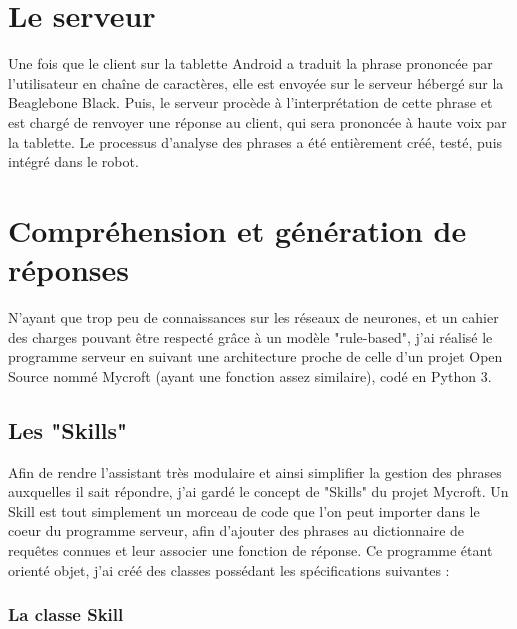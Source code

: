\documentclass{report}
\begin{document}
    \section{Le serveur}

    {Une fois que le client sur la tablette Android a traduit la phrase prononcée
    par l'utilisateur en chaîne de caractères, elle est envoyée sur le serveur
    hébergé sur la Beaglebone Black. Puis, le serveur procède à l'interprétation
    de cette phrase et est chargé de renvoyer une réponse au client, qui sera
    prononcée à haute voix par la tablette. Le processus d'analyse des phrases
    a été entièrement créé, testé, puis intégré dans le robot.}

    \section{Compréhension et génération de réponses}
    {N'ayant que trop peu de connaissances sur les réseaux de neurones, et un cahier des
    charges pouvant être respecté grâce à un modèle "rule-based", j'ai réalisé
    le programme serveur en suivant une architecture proche de celle d'un projet
    Open Source nommé Mycroft (ayant une fonction assez similaire), codé en Python 3.}
      \subsection{Les "Skills"}
      {Afin de rendre l'assistant très modulaire et ainsi simplifier la gestion des phrases
      auxquelles il sait répondre, j'ai gardé le concept de "Skills" du projet Mycroft.
      Un Skill est tout simplement un morceau de code que l'on peut importer dans le coeur
       du programme serveur, afin d'ajouter des phrases au dictionnaire de requêtes connues
        et leur associer une fonction de réponse.\newline}
      {Ce programme étant orienté objet, j'ai créé des classes possédant les
      spécifications suivantes :\newline\newline}

      \subsubsection{La classe Skill}
\end{document}
